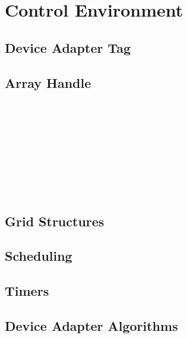 \section{Control Environment}
\label{sec:ControlEnvironment}

\subsection{Device Adapter Tag}
\label{sec:DeviceAdapterTag}


\subsection{Array Handle}
\label{sec:ArrayHandle}

 \\
 \\
 \\
 \\
 \\
 \\
 \\
 \\

\subsection{Grid Structures}
\label{sec:GridStructures}


\subsection{Scheduling}
\label{sec:Scheduling}


\subsection{Timers}
\label{sec:Timers}


\subsection{Device Adapter Algorithms}
\label{sec:DeviceAdapterAlgorithms}

